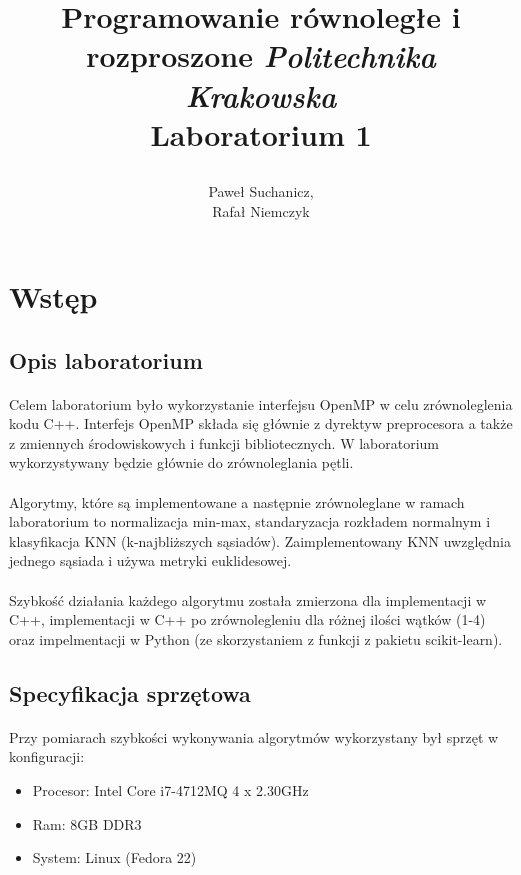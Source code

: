 \documentclass[a4paper,11pt]{article}
\title{
	\textbf{Programowanie równoległe i rozproszone}\vspace{40pt}
	\textit{Politechnika Krakowska} \\\vspace{40pt}
	Laboratorium 1
	\vspace{300pt}

}
\author{
	Paweł Suchanicz,\\
	Rafał Niemczyk
}
\begin{document}
\begin{titlepage}
\maketitle
\end{titlepage}

\begin{center}
\tableofcontents
\end{center}
\newpage
\section{Wstęp}
\subsection{Opis laboratorium}
\paragraph{}Celem laboratorium było wykorzystanie interfejsu OpenMP w celu zrównoleglenia kodu C++. Interfejs OpenMP składa się głównie z dyrektyw preprocesora a także z zmiennych środowiskowych i funkcji bibliotecznych. W laboratorium wykorzystywany będzie głównie do zrównoleglania pętli.
\paragraph{}Algorytmy, które są implementowane a następnie zrównoleglane w ramach laboratorium to normalizacja min-max, standaryzacja rozkładem normalnym i klasyfikacja KNN (k-najbliższych sąsiadów). Zaimplementowany KNN  uwzględnia jednego sąsiada i używa metryki euklidesowej.
\paragraph{}Szybkość działania każdego algorytmu została zmierzona dla implementacji w C++, implementacji w C++ po zrównolegleniu dla różnej ilości wątków (1-4) oraz impelmentacji w Python (ze skorzystaniem z funkcji z pakietu scikit-learn).
\subsection{Specyfikacja sprzętowa}
\paragraph{}Przy pomiarach szybkości wykonywania algorytmów wykorzystany był sprzęt w konfiguracji:
\begin{itemize}
\item Procesor: Intel Core i7-4712MQ 4 x 2.30GHz
\item Ram: 8GB DDR3
\item System: Linux (Fedora 22)
\end{itemize}
\end{document}
